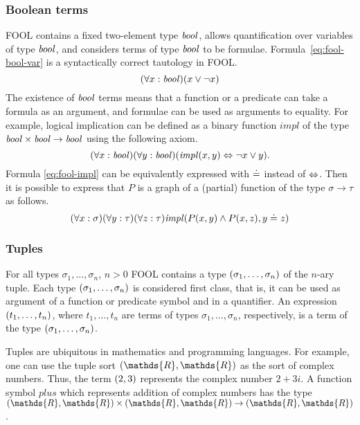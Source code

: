 \documentclass{easychair}
\begin{document}
\subsubsection*{Boolean terms}
FOOL contains a fixed two-element type $\mathit{bool}$, allows quantification over 
variables of type $\mathit{bool}$, and considers terms of type $\mathit{bool}$ to be formulae. 
Formula~\ref{eq:fool-bool-var} is a syntactically correct tautology in FOOL.
\begin{equation}\label{eq:fool-bool-var}
(\forall x:\mathit{bool})(x \lor \neg x)
\end{equation}
The existence of $\mathit{bool}$ terms means that a function or a predicate can take 
a formula as an argument, and formulae can be used as arguments to equality.
For example, logical implication can be defined as a binary function
$\mathit{impl}$ of the type $\mathit{bool} \times \mathit{bool} \to \mathit{bool}$ using the following
axiom.
\begin{equation}\label{eq:fool-impl}
(\forall x:\mathit{bool})(\forall y:\mathit{bool})(\mathit{impl}(x,y) \Leftrightarrow \neg x \lor y).
\end{equation}
Formula \ref{eq:fool-impl} can be equivalently expressed with $\doteq$ instead of
$\Leftrightarrow$.
Then it is possible to express that $P$ is a graph of a (partial) function of 
the type $\sigma \to \tau$ as follows.
\begin{equation}\label{eq:bool-arg-example}
(\forall x:\sigma)(\forall y:\tau)(\forall z:\tau)
\mathit{impl}(P(x,y) \land P(x,z), y \doteq z)
\end{equation}

\subsubsection*{Tuples}
For all types $\sigma_1,\ldots,\sigma_n$, $n>0$ FOOL contains a type $({\sigma_1,\ldots,\sigma_n})$ of the $n$-ary tuple. Each type
$({\sigma_1,\ldots,\sigma_n})$ is considered first class, that is, it can be
used as argument of a function or predicate symbol and in a quantifier.
An expression $({t_1,\ldots,t_n})$, where $t_1,\ldots,t_n$ are terms of
types $\sigma_1,\ldots,\sigma_n$, respectively, is a term of the type
$({\sigma_1,\ldots,\sigma_n})$.

Tuples are ubiquitous in mathematics and programming languages. For example,
one can use the tuple sort $\tuple{\mathds{R},\mathds{R}}$ as the sort of
complex numbers. Thus, the term $({2,3})$ represents the complex number
$2+3i$. A function symbol $\mathit{plus}$ which represents addition of complex numbers has the type $\tuple{\mathds{R},\mathds{R}} \times \tuple{\mathds{R},\mathds{R}} \to \tuple{\mathds{R},\mathds{R}}$.
\end{document}
